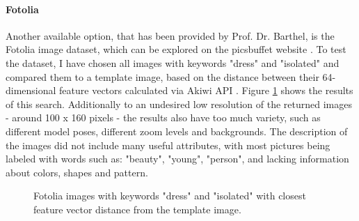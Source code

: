 \documentclass{article}
\begin{document}
\paragraph{Fotolia}
Another available option, that has been provided by Prof. Dr. Barthel, is the Fotolia image dataset, which can be explored on the picsbuffet website \cite{noauthor_picsbuffet_nodate}. To test the dataset, I have chosen all images with keywords "dress" and "isolated" and compared them to a template image, based on the distance between their 64-dimensional feature vectors calculated via Akiwi API \cite{sonnenberg_akiwi_nodate}. Figure \ref{fig:fotolia} shows the results of this search. Additionally to an undesired low resolution of the returned images - around 100 x 160 pixels - the results also have too much variety, such as different model poses, different zoom levels and backgrounds. The description of the images did not include many useful attributes, with most pictures being labeled with words such as: "beauty", "young", "person", and lacking information about colors, shapes and pattern.

\begin{figure}[h]
\centering
{}\hspace{1cm}
\caption{\label{fig:fotolia} Fotolia images with keywords "dress" and "isolated" with closest feature vector distance from the template image.}
\end{figure}
\end{document}
